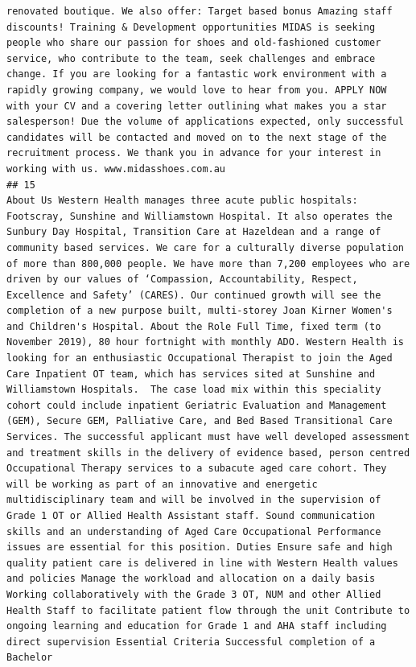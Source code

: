 \documentclass[11pt,a4paper,]{article}
\begin{document}
\begin{verbatim}
renovated boutique. We also offer: Target based bonus Amazing staff discounts! Training & Development opportunities MIDAS is seeking people who share our passion for shoes and old-fashioned customer service, who contribute to the team, seek challenges and embrace change. If you are looking for a fantastic work environment with a rapidly growing company, we would love to hear from you. APPLY NOW with your CV and a covering letter outlining what makes you a star salesperson! Due the volume of applications expected, only successful candidates will be contacted and moved on to the next stage of the recruitment process. We thank you in advance for your interest in working with us. www.midasshoes.com.au
## 15                                                                                                                                                                                                                                                                                                                                                                                                                                                                                                                                                                                                                                                                                      About Us Western Health manages three acute public hospitals: Footscray, Sunshine and Williamstown Hospital. It also operates the Sunbury Day Hospital, Transition Care at Hazeldean and a range of community based services. We care for a culturally diverse population of more than 800,000 people. We have more than 7,200 employees who are driven by our values of ‘Compassion, Accountability, Respect, Excellence and Safety’ (CARES). Our continued growth will see the completion of a new purpose built, multi-storey Joan Kirner Women's and Children's Hospital. About the Role Full Time, fixed term (to November 2019), 80 hour fortnight with monthly ADO. Western Health is looking for an enthusiastic Occupational Therapist to join the Aged Care Inpatient OT team, which has services sited at Sunshine and Williamstown Hospitals.  The case load mix within this speciality cohort could include inpatient Geriatric Evaluation and Management (GEM), Secure GEM, Palliative Care, and Bed Based Transitional Care Services. The successful applicant must have well developed assessment and treatment skills in the delivery of evidence based, person centred Occupational Therapy services to a subacute aged care cohort. They will be working as part of an innovative and energetic multidisciplinary team and will be involved in the supervision of Grade 1 OT or Allied Health Assistant staff. Sound communication skills and an understanding of Aged Care Occupational Performance issues are essential for this position. Duties Ensure safe and high quality patient care is delivered in line with Western Health values and policies Manage the workload and allocation on a daily basis Working collaboratively with the Grade 3 OT, NUM and other Allied Health Staff to facilitate patient flow through the unit Contribute to ongoing learning and education for Grade 1 and AHA staff including direct supervision Essential Criteria Successful completion of a Bachelor 
\end{verbatim}
\end{document}
